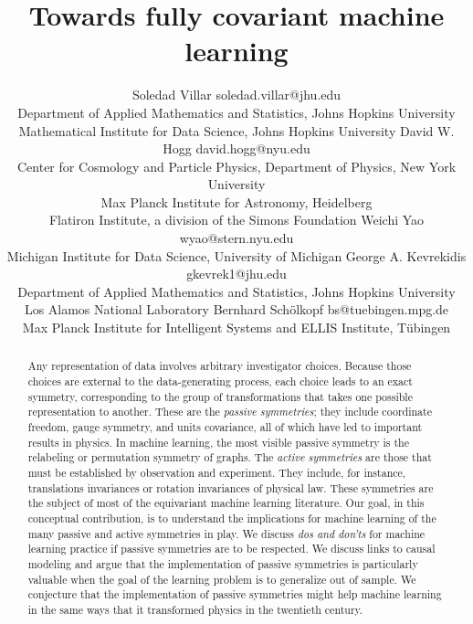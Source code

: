 \documentclass[accepted]{article}
\title{Towards fully covariant machine learning}
\author{\name Soledad Villar\footnotemark[1]{} \email soledad.villar@jhu.edu\\
      \addr Department of Applied Mathematics and Statistics, Johns Hopkins University\\
      \addr Mathematical Institute for Data Science, Johns Hopkins University
      \AND
      \name David W. Hogg\footnotemark[1]{} \email david.hogg@nyu.edu\\
      \addr Center for Cosmology and Particle Physics, Department of Physics, New York University\\
      \addr Max Planck Institute for Astronomy, Heidelberg\\
      \addr Flatiron Institute, a division of the Simons Foundation
      \AND
      \name Weichi Yao \email wyao@stern.nyu.edu\\
      \addr Michigan Institute for Data Science, University of Michigan
      \AND
      \name George A. Kevrekidis \email gkevrek1@jhu.edu\\
      \addr Department of Applied Mathematics and Statistics, Johns Hopkins University\\
      \addr Los Alamos National Laboratory
      \AND
      \name Bernhard Sch\"olkopf \email bs@tuebingen.mpg.de\\
      \addr Max Planck Institute for Intelligent Systems and ELLIS Institute, T\"ubingen
     }
\begin{document}
\maketitle%
\renewcommand{\thefootnote}{\fnsymbol{footnote}}\renewcommand{\thefootnote}{\arabic{footnote}}\addtocounter{footnote}{-1}

\begin{abstract}
Any representation of data involves arbitrary investigator choices.
Because those choices are external to the data-generating process, each choice leads to an exact symmetry, corresponding to the group of transformations that takes one possible representation to another.
These are the \emph{passive symmetries}; they include coordinate freedom, gauge symmetry, and units covariance, all of which have led to important results in physics.
In machine learning, the most visible passive symmetry is the relabeling or permutation symmetry of graphs.
The \emph{active symmetries} are those that must be established by observation and experiment.
They include, for instance, translations invariances or rotation invariances of physical law. 
These symmetries are the subject of most of the equivariant machine learning literature.
Our goal, in this conceptual contribution, is to understand the implications for machine learning of the many passive and active symmetries in play.
We discuss \emph{dos and don'ts} for machine learning practice if passive symmetries are to be respected.
We discuss links to causal modeling and argue that the implementation of passive symmetries is particularly valuable when the goal of the learning problem is to generalize out of sample.
We conjecture that the implementation of passive symmetries might help machine learning in the same ways that it transformed physics in the twentieth century.
\end{abstract}
\end{document}
